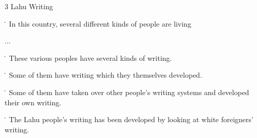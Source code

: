 
3 Lahu Writing

\. In this country, several different kinds of people are living

...

\. These various peoples have several kinds of writing.

\. Some of them have writing which they themselves developed.

\. Some of them have taken over other people's writing systems and developed their
own writing.

\. The Lahu people's writing has been developed by looking at white foreigners'
writing.


